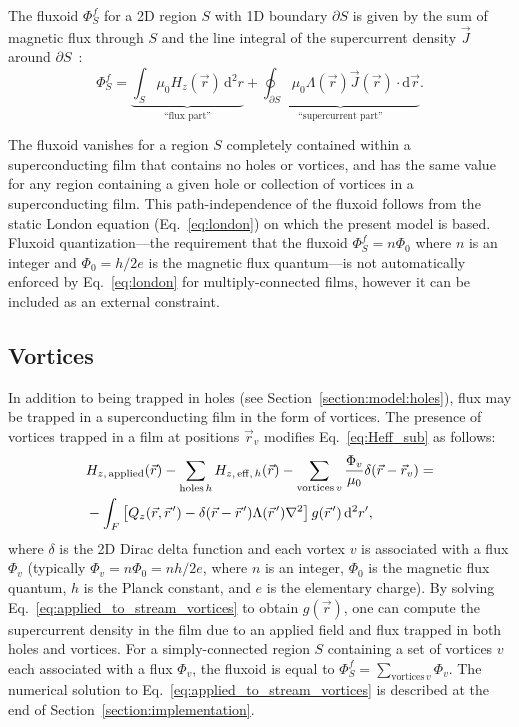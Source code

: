 \documentclass[final,3p,times,twocolumn]{elsarticle}
\newcommand{\pvec}[1]{\vec{#1}\mkern2mu\vphantom{#1}}
\newcounter{bla}
\begin{document}
The fluxoid $\Phi^f_S$ for a 2D region $S$ with 1D boundary $\partial S$ is given by the sum of magnetic flux through $S$ and the line integral of the supercurrent density $\vec{J}$ around $\partial S$~\cite{Brandt2005-wj,Clem2005-ye,Tinkham2004-zn}:
\begin{equation}
    \Phi^f_S = \underbrace{\int_S\mu_0H_z(\vec{r})\,\mathrm{d}^2r}_\text{``flux part''} + \underbrace{\oint_{\partial S}\mu_0\Lambda(\vec{r})\vec{J}(\vec{r})\cdot\mathrm{d}\vec{r}}_\text{``supercurrent part''}.
    \label{eq:fluxoid}
\end{equation}

The fluxoid vanishes for a region $S$ completely contained within a superconducting film that contains no holes or vortices, and has the same value for any region containing a given hole or collection of vortices in a superconducting film. This path-independence of the fluxoid follows from the static London equation (Eq.~\ref{eq:london}) on which the present model is based. Fluxoid quantization---the requirement that the fluxoid $\Phi^f_S=n\Phi_0$ where $n$ is an integer and $\Phi_0=h/2e$ is the magnetic flux quantum---is not automatically enforced by Eq.~\ref{eq:london} for multiply-connected films, however it can be included as an external constraint.

\subsection{Vortices}
\label{section:model:vortices}
In addition to being trapped in holes (see Section~\ref{section:model:holes}), flux may be trapped in a superconducting film in the form of vortices. The presence of vortices trapped in a film at positions $\vec{r}_v$ modifies Eq.~\ref{eq:Heff_sub} as follows:
\begin{align}
\begin{split}
    \label{eq:applied_to_stream_vortices}
    & H_{z,\,\mathrm{applied}}(\vec{r}) - \sum_{\mathrm{holes}\,h} H_{z,\,\mathrm{eff},\,h}(\vec{r}) - \sum_{\mathrm{vortices}\,v}\frac{\Phi_v}{\mu_0}\delta(\vec{r}-\vec{r}_v)
    = \\
    &-\int_F\left[
        Q_z(\vec{r},\pvec{r}')-\delta(\vec{r}-\pvec{r}')\Lambda(\pvec{r}')\nabla^2\right
    ]g(\pvec{r}')\,\mathrm{d}^2r',
\end{split}
\end{align}
where $\delta$ is the 2D Dirac delta function and each vortex $v$ is associated with a flux $\Phi_v$ (typically $\Phi_v=n\Phi_0=nh/2e$, where $n$ is an integer, $\Phi_0$ is the magnetic flux quantum, $h$ is the Planck constant, and $e$ is the elementary charge). By solving Eq.~\ref{eq:applied_to_stream_vortices} to obtain $g(\vec{r})$, one can compute the supercurrent density in the film due to an applied field and flux trapped in both holes and vortices. For a simply-connected region $S$ containing a set of vortices $v$ each associated with a flux $\Phi_v$, the fluxoid is equal to $\Phi^f_S=\sum_{\mathrm{vortices}\,v}\Phi_v$. The numerical solution to Eq.~\ref{eq:applied_to_stream_vortices} is described at the end of Section~\ref{section:implementation}.
\end{document}
